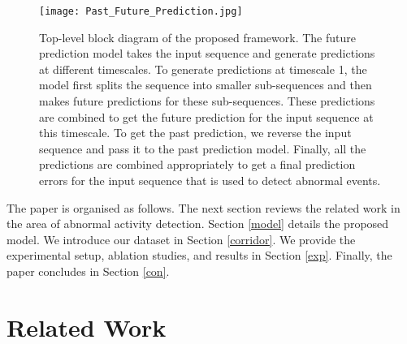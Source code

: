 \documentclass[conference]{IEEEtran}
\begin{document}
\begin{figure*}
    \centering
    \texttt{[image: Past\_Future\_Prediction.jpg]}
    \caption{Top-level block diagram of the proposed framework. The future prediction model takes the input sequence and generate predictions at different timescales. To generate predictions at timescale 1, the model first splits the sequence into smaller sub-sequences and then makes future predictions for these sub-sequences. These predictions are combined to get the future prediction for the input sequence at this timescale. To get the past prediction, we reverse the input sequence and pass it to the past prediction model. Finally, all the predictions are combined appropriately to get a final prediction errors for the input sequence that is used to detect abnormal events.}
    \label{fig:block}
\end{figure*}


The paper is organised as follows. The next section reviews the related work in the area of abnormal activity detection. Section \ref{model} details the proposed model. We introduce our dataset in Section \ref{corridor}. We provide the experimental setup, ablation studies, and results in Section \ref{exp}. Finally, the paper concludes in Section \ref{con}.


\section{Related Work}
\label{related}
\end{document}
